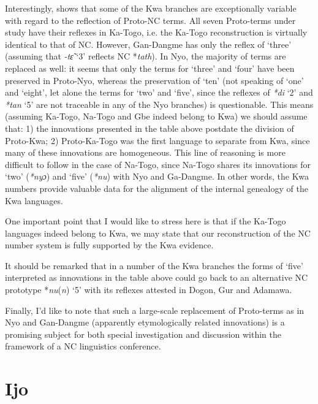 Interestingly,  shows that some of the Kwa branches are exceptionally variable with regard to the reflection of Proto-NC terms. All seven Proto-terms under study have their reflexes in Ka-Togo, i.e. the Ka-Togo reconstruction is virtually identical to that of NC. However, Gan-Dangme has only the reflex of ‘three’ (assuming that \textit{-t{\~{ɛ}}} ‘3’ reflects NC *\textit{tath}). In Nyo, the majority of terms are replaced as well: it seems that only the terms for ‘three’ and ‘four’ have been preserved in Proto-Nyo, whereas the preservation of ‘ten’ (not speaking of ‘one’ and ‘eight’, let alone the terms for ‘two’ and ‘five’, since the reflexes of \textit{*di} ‘2’ and \textit{*tan} ‘5’ are not traceable in any of the Nyo branches) is questionable. This means (assuming Ka-Togo, Na-Togo and Gbe indeed belong to Kwa) we should assume that: 1) the innovations presented in the table above postdate the division of Proto-Kwa; 2) Proto-Ka-Togo was the first language to separate from Kwa, since many of these innovations are homogeneous. This line of reasoning is more difficult to follow in the case of Na-Togo, since Na-Togo shares its innovations for ‘two’ (\textit{*ny}\textit{ɔ}) and ‘five’ (\textit{*nu}) with Nyo and Ga-Dangme. In other words, the Kwa numbers provide valuable data for the alignment of the internal genealogy of the Kwa languages.

\newpage 
One important point that I would like to stress here is that if the Ka-Togo languages indeed belong to Kwa, we may state that our reconstruction of the NC number system is fully supported by the Kwa evidence.  

It should be remarked that in a number of the Kwa branches the forms of ‘five’ interpreted as innovations in the table above could go back to an alternative NC prototype *\textit{nu}(\textit{n}) ‘5’ with its reflexes attested in Dogon, Gur and Adamawa.

Finally, I’d like to note that such a large-scale replacement of Proto-terms as in Nyo and Gan-Dangme (apparently etymologically related innovations) is a promising subject for both special investigation and discussion within the framework of a NC linguistics conference.


\section{Ijo}%

